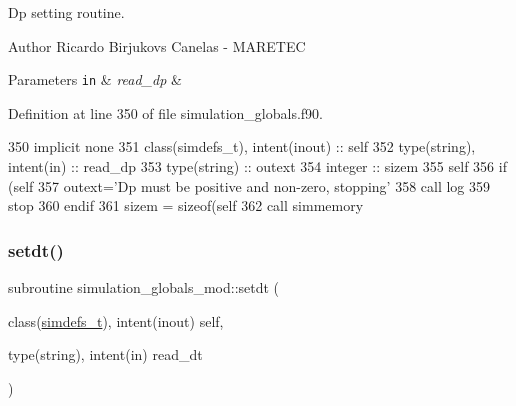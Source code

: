 Dp setting routine. 

\begin{DoxyAuthor}{Author}
Ricardo Birjukovs Canelas -\/ M\+A\+R\+E\+T\+EC
\end{DoxyAuthor}

\begin{DoxyParams}[1]{Parameters}
\mbox{\tt in}  & {\em read\+\_\+dp} & \\
\hline
\end{DoxyParams}


Definition at line 350 of file simulation\+\_\+globals.\+f90.


\begin{DoxyCode}
350     \textcolor{keywordtype}{implicit none}
351     \textcolor{keywordtype}{class}(simdefs\_t), \textcolor{keywordtype}{intent(inout)} :: self
352     \textcolor{keywordtype}{type}(string), \textcolor{keywordtype}{intent(in)} :: read\_dp
353     \textcolor{keywordtype}{type}(string) :: outext
354     \textcolor{keywordtype}{integer} :: sizem
355     self%
356     \textcolor{keywordflow}{if} (self%
357         outext=\textcolor{stringliteral}{'Dp must be positive and non-zero, stopping'}
358         \textcolor{keyword}{call }log%
359         stop
360 \textcolor{keywordflow}{    endif}
361     sizem = sizeof(self%
362     \textcolor{keyword}{call }simmemory%
\end{DoxyCode}
\mbox{\label{namespacesimulation__globals__mod_aecf75eeccef4eeae6d10ab26cf2dcfcf}} 
\subsubsection{\texorpdfstring{setdt()}{setdt()}}
{\footnotesize\ttfamily subroutine simulation\+\_\+globals\+\_\+mod\+::setdt (\begin{DoxyParamCaption}\item[{class(\mbox{\hyperlink{structsimulation__globals__mod_1_1simdefs__t}{simdefs\+\_\+t}}), intent(inout)}]{self,  }\item[{type(string), intent(in)}]{read\+\_\+dt }\end{DoxyParamCaption})\hspace{0.3cm}{\ttfamily [private]}}



